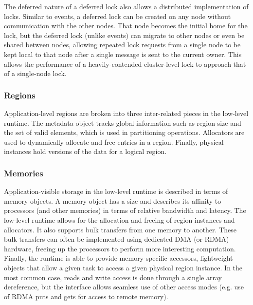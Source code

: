 The deferred nature of a deferred lock also allows a distributed implementation
of locks.  Similar to events, a deferred lock can be created on any node
without communication with the other nodes.  That node becomes
the initial home for the lock, but the deferred lock (unlike events) can 
migrate to other nodes or even be shared between nodes, allowing repeated
lock requests from a single node to be kept local to that node after a single
message is sent to the current owner.  
This allows the performance of a
heavily-contended cluster-level lock to approach that of a single-node lock.


\subsubsection{Regions}
\label{subsec:regionmeta}
Application-level regions are broken into three inter-related pieces in the
low-level runtime.  The metadata object tracks global information such as
region size and the set of valid elements, which is used in partitioning
operations.  Allocators are used to dynamically allocate and
free entries in a region.  Finally, physical instances hold versions of the data for 
a logical region.

\subsubsection{Memories}
\label{subsec:memories}
Application-visible storage in the low-level runtime is described in terms of
memory objects.  A memory object has a size and describes its affinity to 
processors (and other memories) in terms of relative bandwidth and latency.
The low-level runtime allows for the allocation and freeing of region instances
and allocators.  It also supports bulk transfers from one memory to another.
These bulk transfers can often be implemented using dedicated DMA (or RDMA)
hardware, freeing up the processors to perform more interesting
computation.  Finally, the runtime is able to provide memory-specific accessors,
lightweight objects that allow a given task to access a given physical region
instance.  In the most common case, reads and write access is done through a 
single array dereference, but the interface allows seamless use of other
access modes (e.g. use of RDMA puts and gets for access to remote memory).

